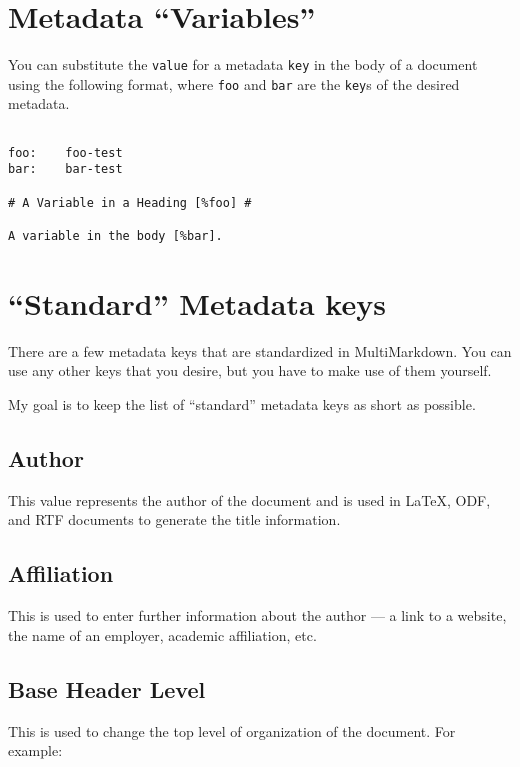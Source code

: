 \section{Metadata ``Variables'' }
\label{metadatavariables}

You can substitute the \texttt{value} for a metadata \texttt{key} in the body of a document using the following format, where \texttt{foo} and \texttt{bar} are the \texttt{key}s of the desired metadata.

\begin{verbatim}

foo:	foo-test
bar:	bar-test

# A Variable in a Heading [%foo] #

A variable in the body [%bar].
\end{verbatim}

\section{``Standard'' Metadata keys }
\label{standardmetadatakeys}

There are a few metadata keys that are standardized in MultiMarkdown. You can
use any other keys that you desire, but you have to make use of them yourself.

My goal is to keep the list of ``standard'' metadata keys as short as possible.

\subsection{Author }
\label{author}

This value represents the author of the document and is used in LaTeX, ODF, and RTF
documents to generate the title information.

\subsection{Affiliation }
\label{affiliation}

This is used to enter further information about the author --- a link to a
website, the name of an employer, academic affiliation, etc.

\subsection{Base Header Level }
\label{baseheaderlevel}

This is used to change the top level of organization of the document. For example:

